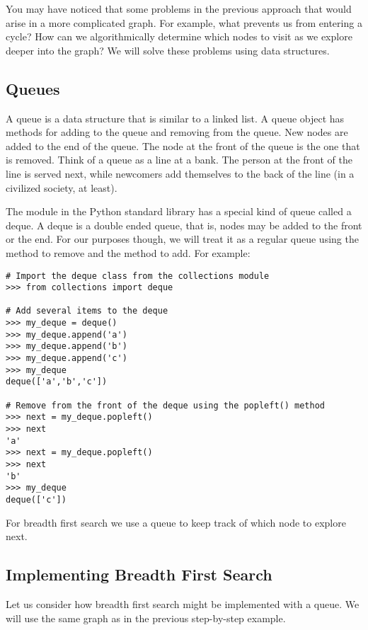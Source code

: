 You may have noticed that some problems in the previous approach that would arise in a more complicated graph.
For example, what prevents us from entering a cycle?
How can we algorithmically determine which nodes to visit as we explore deeper into the graph?
We will solve these problems using data structures.

\subsection*{Queues}

A queue is a data structure that is similar to a linked list.
A queue object has methods for adding to the queue and removing from the queue.
New nodes are added to the end of the queue.
The node at the front of the queue is the one that is removed.
Think of a queue as a line at a bank.
The person at the front of the line is served next, while newcomers add themselves to the back of the line (in a civilized society, at least).

The  module in the Python standard library has a special kind of queue called a deque.
A deque is a double ended queue, that is, nodes may be added to the front or the end.
For our purposes though, we will treat it as a regular queue using the  method to remove and the  method to add.
For example:
\begin{lstlisting}
# Import the deque class from the collections module
>>> from collections import deque

# Add several items to the deque
>>> my_deque = deque()
>>> my_deque.append('a')
>>> my_deque.append('b')
>>> my_deque.append('c')
>>> my_deque
deque(['a','b','c'])

# Remove from the front of the deque using the popleft() method
>>> next = my_deque.popleft()
>>> next
'a'
>>> next = my_deque.popleft()
>>> next
'b'
>>> my_deque
deque(['c'])
\end{lstlisting}

For breadth first search we use a queue to keep track of which node to explore next.

\subsection*{Implementing Breadth First Search}

Let us consider how breadth first search might be implemented with a queue.
We will use the same graph as in the previous step-by-step example.

